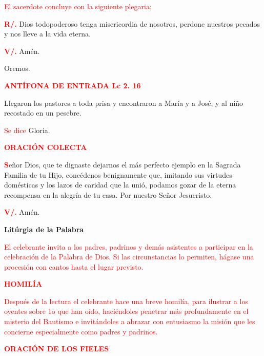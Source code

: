 \documentclass[12pt, letterpaper]{report}
\begin{document}
\large {\textcolor{red}{El sacerdote concluye con la siguiente plegaria:}} 

\Large {\bfseries \textcolor{red}{R/.}} \hspace{1cm} Dios todopoderoso tenga misericordia de nosotros, perdone nuestros pecados y nos lleve a la vida eterna.

\Large {\bfseries \textcolor{red}{V/.}} \hspace{1cm} Am\'en.

\noindent
\Large {Oremos.}

\large {\bfseries \textcolor{red}{ANT\'IFONA DE ENTRADA \hspace{1cm} Lc 2. 16} }

\noindent
\Large {Llegaron los pastores a toda prisa y encontraron a Mar\'ia y a Jos\'e, y al ni\~no recostado en un pesebre.}

\large {\textcolor{red}{Se dice} Gloria.}

\large {\bfseries \textcolor{red}{ORACI\'ON COLECTA}}

\lettrine[lines=1]{\bfseries \textcolor{red}{S}}{}\Large {e\~nor Dios, que te dignaste dejarnos el m\'as perfecto ejemplo en la Sagrada Familia de tu Hijo, conc\'edenos benignamente que, imitando sus virtudes dom\'esticas y los lazos de caridad que la uni\'o, podamos gozar de la eterna recompensa en la alegr\'ia de tu casa. Por nuestro Se\~nor Jesucristo.}

\Large {\bfseries \textcolor{red}{V/.}} \hspace{1cm} Am\'en.

\newpage

\begin{center}
\Huge {\bfseries Lit\'urgia de la Palabra}
\end{center}

\large {\textcolor{red}{El celebrante invita a los padres, padrinos y dem\'as asistentes a participar en la celebraci\'on de la Palabra de Dios. Si las circunstancias lo permiten, h\'agase una procesi\'on con cantos hasta el lugar previsto.}} 

\Large {\bfseries \textcolor{red}{HOMIL\'IA}} 

\large {\textcolor{red}{Despu\'es de la lectura el celebrante hace una breve homil\'ia, para ilustrar a los oyentes sobre 1o que han o\'ido, haci\'endoles penetrar m\'as profundamente en el misterio del Bautismo e invit\'andoles a abrazar con entusiasmo la misi\'on que les concierne especialmente como padres y padrinos.}}

\Large {\bfseries \textcolor{red}{ORACI\'ON DE LOS FIELES}} 
\end{document}
